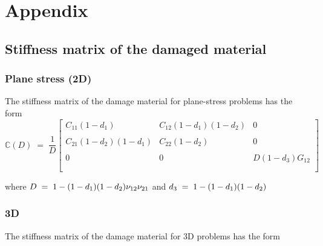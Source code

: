 \documentclass[12pt,a4paper,twoside,openright]{report}
\newcounter{savepage}
\begin{document}
\chapter*{Appendix}

\renewcommand{\thesection}{\Alph{section}}
\setcounter{page}{\thesavepage}
\section{Stiffness matrix of the damaged material}\label{Stiffness matrix of the damaged material}
\subsection*{Plane stress (2D)}
The stiffness matrix of the damage material for plane-stress problems has the form \\

\begin{equation*}
\mathbb{C}(D) \; = \; \frac{1}{D}
 \begin{bmatrix}
  C_{11}(1 - d_{1}) & C_{12}(1 - d_{1})(1 - d_{2})  & 0 \\
  \\
  C_{21}(1 - d_{2})(1 - d_{1}) & C_{22}(1 - d_{2}) & 0 \\
 \\  
  0 & 0 &  D(1 - d_{3})G_{12} \\
  \\
 \end{bmatrix}
\end{equation*}

where $\mathlarger{D \; = \; 1 - (1 - d_{1})(1 - d_{2}) \nu_{12}\nu_{21}}$ and $\mathlarger{d_{3} \; = \; 1 - (1 - d_{1})(1 - d_{2}) }$



\subsection*{3D}
The stiffness matrix of the damage material for 3D problems has the form \\
\end{document}
